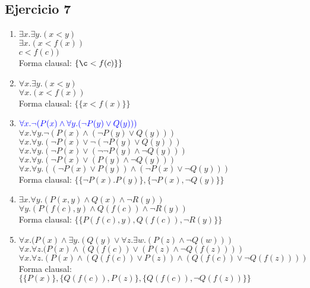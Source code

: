 \documentclass[10pt,a4paper]{article}
\begin{document}
\subsection{Ejercicio 7}
    \begin{enumerate}
        \item 
        $\exists x. \exists y. (x<y)$ \\
        $\exists x. (x<f(x))$ \\
        $c<f(c))$ \\
        Forma clausal: $\{\c<f(c)\}\}$
        \item 
        $\forall x. \exists y. (x<y)$ \\
        $\forall x. (x<f(x))$ \\
        Forma clausal: $\{\{x<f(x)\}\}$
        \item 
        ${\color{blue}\forall x. \neg(P(x) \wedge \forall y.(\neg P(y) \vee Q(y)))}$ \\
        $\forall x. \forall y. \neg(P(x) \wedge (\neg P(y) \vee Q(y)))$ \\
        $\forall x. \forall y. (\neg P(x) \vee \neg(\neg P(y) \vee Q(y)))$ \\
        $\forall x. \forall y. (\neg P(x) \vee (\neg \neg P(y) \wedge \neg Q(y)))$ \\
        $\forall x. \forall y. (\neg P(x) \vee (P(y) \wedge \neg Q(y)))$ \\
        $\forall x. \forall y. ( (\neg P(x) \vee P(y)) \wedge (\neg P(x) \vee \neg Q(y) ) )$ \\
        Forma clausal: $\{\{ \neg P(x). P(y)\},\{ \neg P(x), \neg Q(y)\}\}$
        \item 
        $\exists x. \forall y. (P(x,y) \wedge Q(x) \wedge \neg R(y))$ \\
        $\forall y. (P(f(c),y) \wedge Q(f(c)) \wedge \neg R(y))$ \\
        Forma clausal: $\{\{P(f(c),y), Q(f(c)), \neg R(y)\}\}$
        \item 
        $\forall x. (P(x) \wedge \exists y. (Q(y) \vee \forall z. \exists w. (P(z) \wedge \neg Q(w)))$ \\
        $\forall x. \forall z. (P(x) \wedge (Q(f(c)) \vee (P(z) \wedge \neg Q(f(z))))$ \\
        $\forall x. \forall z. (P(x) \wedge (Q(f(c)) \vee P(z) ) \wedge (Q(f(c)) \vee \neg Q(f(z)) ) )$ \\
        Forma clausal: $\{\{ P(x)\} , \{Q(f(c)), P(z)\} , \{Q(f(c)), \neg Q(f(z))\} \}$
    \end{enumerate}
\end{document}
